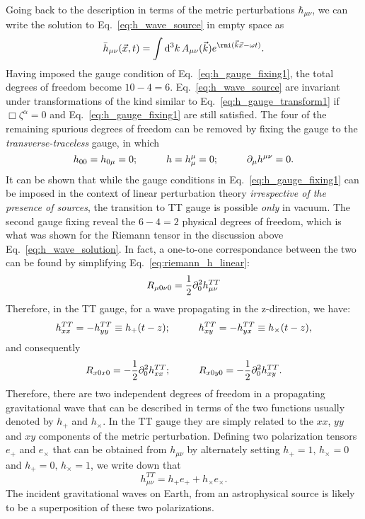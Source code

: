 Going back to the description in terms of the metric perturbations 
$\hbar_{\mu\nu}$, we can write the solution to Eq.~\ref{eq:h_wave_source}
in empty space as
\begin{equation}\label{eq:h_wave_solution}
 \hbarr_{\mu\nu}(\vec{x},t) = \int \D^3 k\, A_{\mu\nu}(\vec{k}) e^{\ii (\vec{k}\dotfill \vec{x} - \omega t)}.
\end{equation}
Having imposed the gauge condition of Eq.~\ref{eq:h_gauge_fixing1}, the total 
degrees of freedom become $10 - 4 = 6$. Eq.~\ref{eq:h_wave_source} are invariant
under transformations of the kind similar to Eq.~\ref{eq:h_gauge_transform1}
if $\Box\zeta^\alpha = 0$ and Eq.~\ref{eq:h_gauge_fixing1} are still satisfied.
The four of the remaining spurious degrees of freedom can be removed by fixing
the gauge to the {\it transverse-traceless} gauge, in which
\begin{equation}
 h_{00} = h_{0\mu} = 0;\hspace{10mm} h = h^\mu_\mu = 0;\hspace{10mm} \pd_\mu h^{\mu\nu} = 0.
\end{equation}
It can be shown that while the gauge conditions in Eq.~\ref{eq:h_gauge_fixing1}
can be imposed in the context of linear perturbation theory {\it irrespective of
the presence of sources}, the transition to TT gauge is possible {\it only} in 
vacuum. 
%
The second gauge fixing reveal the $6 - 4 = 2$ physical degrees of freedom, which
is what was shown for the Riemann tensor in the discussion above 
Eq.~\ref{eq:h_wave_solution}. 
In fact, a one-to-one correspondance between the two can be found by simplifying 
Eq.~\ref{eq:riemann_h_linear}:
%
\begin{equation}
 R_{\mu 0\nu 0} = \frac{1}{2}\partial_0^2 h^{TT}_{\mu\nu}
\end{equation}
%
Therefore, in the TT gauge, for a wave propagating in the z-direction, we have:
\begin{equation}
 h_{xx}^{TT} = -h_{yy}^{TT} \equiv h_+(t-z);\hspace{10mm} h_{xy}^{TT} = -h_{yx}^{TT} \equiv h_\times(t-z),
\end{equation}
and consequently
\begin{equation}
 R_{x0x0} = -\frac{1}{2}\pd_0^2 h_{xx}^{TT};\hspace{10mm} R_{x0y0} = -\frac{1}{2}\pd_0^2 h_{xy}^{TT}.
\end{equation}
Therefore, there are two independent degrees of freedom in a propagating 
gravitational wave that can be described in terms of the two functions 
usually denoted by $h_+$ and $h_\times$. In the TT gauge they are simply
related to the $xx$, $yy$ and $xy$ components of the metric perturbation.
Defining two polarization tensors $e_+$ and $e_\times$ that can be obtained
from $h_{\mu\nu}$ by alternately setting $h_+=1,\,h_\times=0$ and 
$h_+=0,\,h_\times=1$, we write down that 
\begin{equation}
 h_{\mu\nu}^{TT} = h_+ e_+ + h_\times e_\times.
\end{equation}
The incident gravitational waves on Earth, from an astrophysical source 
is likely to be a superposition of these two polarizations. 



